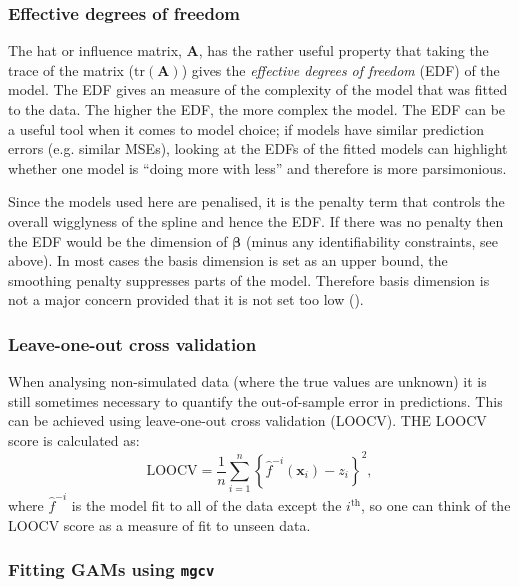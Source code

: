 \subsubsection{Effective degrees of freedom}
\label{GAMEDF}

The hat or influence matrix, $\mathbf{A}$, has the rather useful property that taking the trace of the matrix ($\text{tr}(\mathbf{A})$) gives the \textit{effective degrees of freedom} (EDF) of the model. The EDF gives an measure of the complexity of the model that was fitted to the data. The higher the EDF, the more complex the model. The EDF can be a useful tool when it comes to model choice; if models have similar prediction errors (e.g. similar MSEs), looking at the EDFs of the fitted models can highlight whether one model is ``doing more with less'' and therefore is more parsimonious.

Since the models used here are penalised, it is the penalty term that controls the overall wigglyness of the spline and hence the EDF. If there was no penalty then the EDF would be the dimension of $\bm{\beta}$ (minus any identifiability constraints, see above). In most cases the basis dimension is set as an upper bound, the smoothing penalty suppresses parts of the model. Therefore basis dimension is not a major concern provided that it is not set too low (\cite[p. 161]{simonbook}). 

\subsubsection{Leave-one-out cross validation}
\label{DEFN-LOOCV}

When analysing non-simulated data (where the true values are unknown) it is still sometimes necessary to quantify the out-of-sample error in predictions. This can be achieved using leave-one-out cross validation (LOOCV). THE LOOCV score is calculated as:
\begin{equation}
\text{LOOCV} = \frac{1}{n} \sum_{i=1}^n \left \{ \hat{f}^{-i}(\mathbf{x}_i) - z_i \right\}^2,
\end{equation}
where $\hat{f}^{-i}$ is the model fit to all of the data except the $i^\text{th}$, so one can think of the LOOCV score as a measure of fit to unseen data.

\subsubsection{Fitting GAMs using \texttt{mgcv}}
\label{intro-mgcv}

